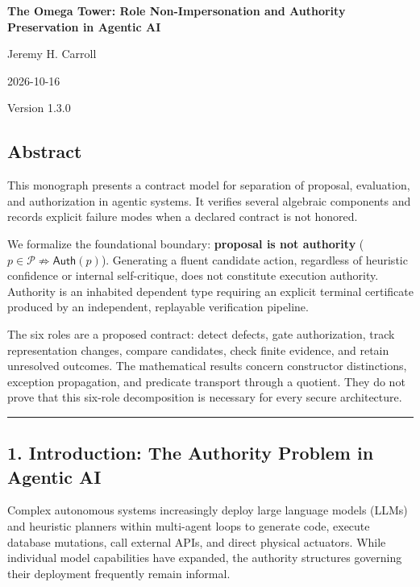 \documentclass[
  10pt,
]{article}
\author{}
\date{}
\begin{document}
\begin{center}
{\LARGE\bfseries The Omega Tower: Role Non-Impersonation and Authority Preservation in
Agentic AI\par}
Jeremy H. Carroll\par
2026-10-16\par
Version 1.3.0\par
\end{center}

\subsection{Abstract}\label{abstract}

This monograph presents a contract model for separation of proposal, evaluation, and authorization in agentic systems. It verifies several algebraic components and records explicit failure modes when a declared contract is not honored.

We formalize the foundational boundary: \textbf{proposal is not authority} (\hypertarget{math-E0001-0001}{}{\(p \in \mathcal{P} \not\Rightarrow \mathsf{Auth}(p)\)}). Generating a fluent candidate action, regardless of heuristic confidence or internal self-critique, does not constitute execution authority. Authority is an inhabited dependent type requiring an explicit terminal certificate produced by an independent, replayable verification pipeline.

The six roles are a proposed contract: detect defects, gate authorization, track representation changes, compare candidates, check finite evidence, and retain unresolved outcomes. The mathematical results concern constructor distinctions, exception propagation, and predicate transport through a quotient. They do not prove that this six-role decomposition is necessary for every secure architecture.

\begin{center}\rule{0.5\linewidth}{0.5pt}\end{center}

\subsection{1. Introduction: The Authority Problem in Agentic AI}\label{introduction-the-authority-problem-in-agentic-ai}

Complex autonomous systems increasingly deploy large language models (LLMs) and heuristic planners within multi-agent loops to generate code, execute database mutations, call external APIs, and direct physical actuators. While individual model capabilities have expanded, the authority structures governing their deployment frequently remain informal.
\end{document}

